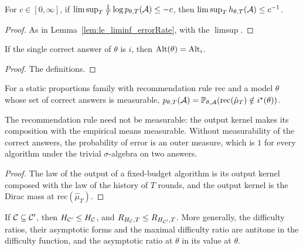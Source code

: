 \begin{lemma}
  \label{lem:limsup_errorRate_le}
  \leanok
  For $c \in [0, \infty]$, if $\limsup_T \frac1T \log p_{\theta, T}(\mathcal{A}) \le -c$, then
  $\limsup_T h_{\theta, T}(\mathcal{A}) \le c^{-1}$.
\end{lemma}

\begin{proof}
  \leanok
  As in Lemma~\ref{lem:le_liminf_errorRate}, with the $\limsup$.
\end{proof}

\begin{lemma}
  \label{lem:alternatives_eq_alt}
  \leanok
  If the single correct answer of $\theta$ is $i$, then $\mathrm{Alt}(\theta) = \mathrm{Alt}_i$.
\end{lemma}

\begin{proof}
  \leanok
  The definitions.
\end{proof}

\begin{lemma}
  \label{lem:errorProb_static}
  \leanok
  For a static proportions family with recommendation rule $\mathrm{rec}$ and a model $\theta$ whose
  set of correct answers is measurable, $p_{\theta, T}(\mathcal{A}) = \mathbb{P}_{\theta, \mathcal{A}}(\mathrm{rec}(\hat
  \mu_T) \notin i^{\star}(\theta))$.
\end{lemma}

The recommendation rule need not be measurable: the output kernel makes its composition with the
empirical means measurable. Without measurability of the correct answers, the probability of error
is an outer measure, which is $1$ for every algorithm under the trivial $\sigma$-algebra on two answers.

\begin{proof}
  \leanok
  The law of the output of a fixed-budget algorithm is its output kernel composed with the law of
  the history of $T$ rounds, and the output kernel is the Dirac mass at $\mathrm{rec}(\hat\mu_T)$.
\end{proof}

\begin{lemma}
  \label{lem:oracleDifficulty_mono}
  \leanok
  If $\mathcal{C} \subseteq \mathcal{C}'$, then $H_{\mathcal{C}'} \le H_{\mathcal{C}}$, and $R_{H_{\mathcal{C}}, T} \le R_{H_{\mathcal{C}'}, T}$.
  More generally, the difficulty ratios, their asymptotic forms and the maximal difficulty ratio
  are antitone in the difficulty function, and the asymptotic ratio at $\theta$ in its value at
  $\theta$.
\end{lemma}

